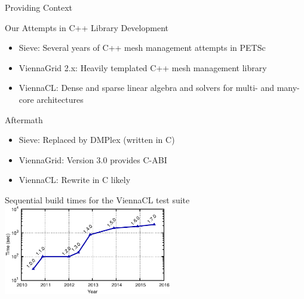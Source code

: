 \begin{frame}{Providing Context}

 \begin{block}{Our Attempts in C++ Library Development}
  \begin{itemize}
   \item Sieve: Several years of C++ mesh management attempts in PETSc
   \item ViennaGrid 2.x: Heavily templated C++ mesh management library
   \item ViennaCL: Dense and sparse linear algebra and solvers for multi- and many-core architectures
  \end{itemize}
 \end{block}

 \begin{block}{Aftermath}
  \begin{itemize}
   \item Sieve: Replaced by DMPlex (written in C)
   \item ViennaGrid: Version 3.0 provides C-ABI
   \item ViennaCL: Rewrite in C likely
  \end{itemize}
 \end{block}

 \vspace*{-2cm}
 \begin{flushright}
  Sequential build times for the ViennaCL test suite \hspace*{0.2cm}\ \\
  \includegraphics[width=0.55\textwidth]{figures/build-time}
 \end{flushright}

\end{frame}








